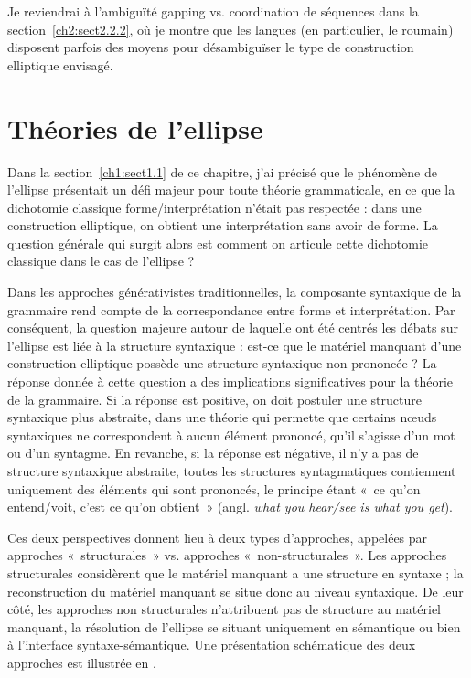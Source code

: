 Je reviendrai à l’ambiguïté gapping vs. coordination de séquences dans la section~\ref{ch2:sect2.2.2}, où je montre que les langues (en particulier, le roumain) disposent parfois des moyens pour désambiguïser le type de construction elliptique envisagé.


\section{Théories de l’ellipse} \label{ch1:sect1.5}

Dans la section~\ref{ch1:sect1.1} de ce chapitre, j’ai précisé que le phénomène de l’ellipse présentait un défi majeur pour toute théorie grammaticale, en ce que la dichoto\-mie classique forme/interprétation n’était pas respectée : dans une construction elliptique, on obtient une interprétation sans avoir de forme. La question générale qui surgit alors est comment on articule cette dichotomie classique dans le cas de l’ellipse ? 

Dans les approches générativistes traditionnelles, la composante syntaxique de la grammaire rend compte de la correspondance entre forme et interprétation. Par conséquent, la question majeure autour de laquelle ont été centrés les débats sur l’ellipse est liée à la structure syntaxique : est-ce que le matériel manquant d’une construction elliptique possède une structure syntaxique {non-prononcée ?} La réponse donnée à cette question a des implications significatives pour la théorie de la grammaire. Si la réponse est positive, on doit postuler une structure syntaxique plus abstraite, dans une théorie qui permette que certains nœuds syntaxiques ne correspondent à aucun élément prononcé, qu’il s’agisse d’un mot ou d’un syntagme. En revanche, si la réponse est négative, il n’y a pas de structure syntaxique abstraite, toutes les structures syntagmatiques contiennent uniquement des éléments qui sont prononcés, le principe étant «~ce qu’on entend/voit, c’est ce qu’on obtient~» (angl. \textit{what you hear/see is what you get}). 

Ces deux perspectives donnent lieu à deux types d’approches, appelées par \citet{Merchant2009} approches «~structurales~» vs. approches «~non-structurales~». Les approches structurales considèrent que le matériel manquant a une structure en syntaxe ; la reconstruction du matériel manquant se situe donc au niveau syntaxique. De leur côté, les approches non structurales n’attribuent pas de structure au matériel manquant, la résolution de l’ellipse se situant uniquement en sémantique ou bien à l’interface syntaxe-sémantique. Une présentation schématique des deux approches est illustrée en .

